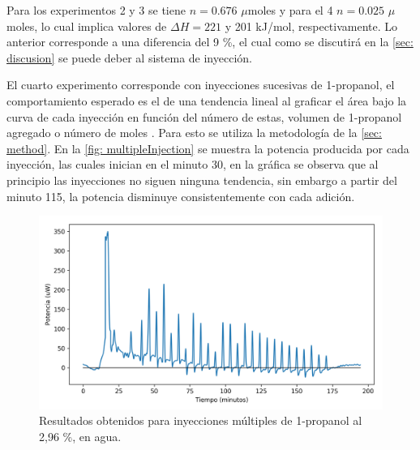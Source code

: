 		Para los experimentos 2 y 3 se tiene $n = 0.676$ $\mu$moles  y para el 4 $n = 0.025$ $\mu$moles, lo cual implica valores de $\Delta H = 221$ y 201 kJ/mol, respectivamente. Lo anterior corresponde a una diferencia del 9 \%, el cual como se discutirá en la \autoref{sec: discusion} se puede deber al sistema de inyección. 
		
		El cuarto experimento corresponde con inyecciones sucesivas de 1-propanol, el comportamiento esperado es el de una tendencia lineal al graficar el \'area bajo la curva de cada inyecci\'on en funci\'on del n\'umero de estas, volumen de 1-propanol agregado o n\'umero de moles \cite{adao2012chemical,demarse2011calibration,nanoitc,adao2012chemical}. Para esto se utiliza la metodolog\'ia de la \autoref{sec: method}. En la \autoref{fig: multipleInjection} se muestra la potencia producida por cada inyecci\'on, las cuales inician en el minuto 30, en la gr\'afica se observa que al principio las inyecciones no siguen ninguna tendencia, sin embargo a partir del minuto 115, la potencia disminuye consistentemente con cada adici\'on.
		\begin{figure}[h]
			\centering
			\includegraphics[width=\linewidth]{../Data/ChemicalCalibrations/multiple}
			\caption{Resultados obtenidos para inyecciones m\'ultiples de 1-propanol al 2,96 \%, en agua.}
			\label{fig: multipleInjection}
		\end{figure}
		
